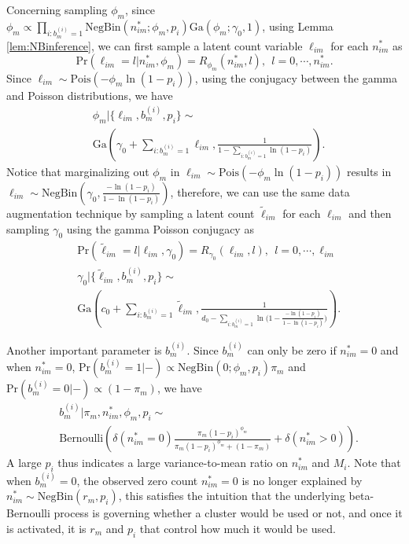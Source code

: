 \documentclass[journal]{IEEEtran}
\newcommand{\beq}{\begin{equation}}
\newcommand{\eeq}{\end{equation}}
\newcommand{\beqs}{\begin{eqnarray}}
\newcommand{\eeqs}{\end{eqnarray}}
\newcommand{\bv}{\boldsymbol{b}}
\begin{document}
Concerning sampling $\phi_m$, since $\phi_m\propto \prod_{i: b_m^{(i)}=1}\mbox{NegBin}(n^{*}_{im};\phi_m ,p_i)\mbox{Ga}( \phi_m;\gamma_0,1)$, using Lemma \ref{lem:NBinference}, we can first sample a latent count variable $\ell_{im}$ for each $n^{*}_{im}$ as
\beq
\mbox{Pr}(\ell_{im} = l|n^{*}_{im},\phi_m) = R_{\phi_m}(n^*_{im},l),~~l=0,\cdots, n^*_{im}.
\eeq
Since $\ell_{im}\sim \mbox{Pois}(-\phi_m\ln(1-p_i))$, using the conjugacy between the gamma and Poisson distributions, we have
\beqs
& \phi_m|\{\ell_{im},b_m^{(i)},p_i\}  \sim \nonumber\\& \mbox{Ga} \left( \gamma_0 +  \sum_{i: b_m^{(i)}=1}  \ell_{im}, \frac{1}{1 - \sum_{i: b_m^{(i)}=1} \ln( 1 - p_i)}\right).
\eeqs
Notice that marginalizing out $\phi_m$ in $\ell_{im}\sim \mbox{Pois}(-\phi_m\ln(1-p_i))$ results in $\ell_{im}\sim \mbox{NegBin}(\gamma_0,\frac{-\ln(1-p_i)}{1-\ln(1-p_i)})$, therefore, we can use the same data augmentation technique by sampling a latent count $\tilde{\ell}_{im}$ for each $\ell_{im}$ and  then %
sampling $\gamma_0$ using the gamma Poisson conjugacy as
\beqs
&\mbox{Pr}(\tilde{\ell}_{im} = l|\ell_{im},\gamma_0) = R_{\gamma_0}(\ell_{im},l),~~l=0,\cdots, \ell_{im}\\
&\gamma_0|\{\tilde{\ell}_{im},b_m^{(i)},p_i\}  \sim \nonumber\\&\mbox{Ga} \left( c_0 +  \sum_{i: b_m^{(i)}=1}  \tilde{\ell}_{im}, \frac{1}{d_0 - \sum_{i: b_m^{(i)}=1} \ln\big( 1 - \frac{-\ln(1-p_i)}{1-\ln(1-p_i)}\big)}\right)\nonumber.
\eeqs

Another important parameter is $b_m^{(i)}$.  Since $b_m^{(i)}$ can only be zero if $n^*_{im}=0$ and when $n^*_{im}=0$, $\mbox{Pr}( b_m^{(i)}=1|-)\propto \mbox{NegBin}(0;\phi_m ,p_i)\pi_m$ and $\mbox{Pr}( b_m^{(i)}=0|-)\propto (1-\pi_m)$,  we have
\beqs
& b_m^{(i)}| \pi_m, n^*_{im},\phi_m,p_i \sim \nonumber\\ &\mbox{Bernoulli}\left(\delta(n^*_{im}=0) \frac{\pi_m(1-p_i)^{\phi_m}}{\pi_m(1-p_i)^{\phi_m} + (1-\pi_m)} + \delta(n^*_{im}>0)\right).\nonumber
\eeqs
A large $p_i$ thus indicates a large variance-to-mean ratio on $n_{im}^*$ and $M_i$. Note that when $b_m^{(i)}=0$, the observed zero count $n_{im}^*=0$ is no longer explained by $n_{im}^*\sim \mbox{NegBin}(r_m,p_i)$, this satisfies the intuition that the underlying beta-Bernoulli process is governing whether a cluster would be used or not, and once it is activated, it is $r_m$ and $p_i$ that control how much it would be used.
\end{document}
